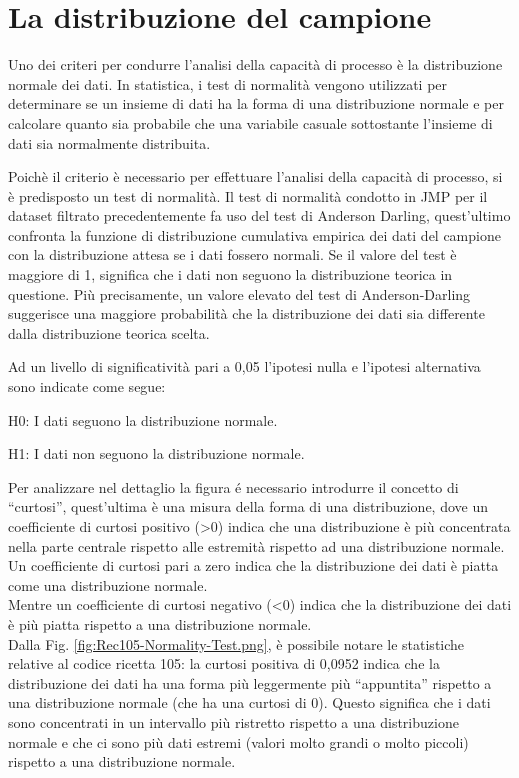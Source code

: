 
\label{La distribuzione del campione}
\section{La distribuzione del campione}

Uno dei criteri per condurre l'analisi della capacità di processo è la distribuzione normale dei dati.
In statistica, i test di normalità vengono utilizzati per determinare se un insieme di dati ha la forma di una distribuzione normale e per calcolare quanto sia probabile che una variabile casuale sottostante l'insieme di dati sia normalmente distribuita.
\cite{KULKARNI2022329}


Poichè il criterio è necessario per effettuare l'analisi della capacità di processo, si è predisposto un test di normalità.
Il test di normalità condotto in JMP per il dataset filtrato precedentemente fa uso del test di Anderson Darling, quest'ultimo confronta la funzione di distribuzione cumulativa empirica dei dati del campione con la distribuzione attesa se i dati fossero normali.
Se il valore del test è maggiore di 1, significa che i dati non seguono la distribuzione teorica in questione. Più precisamente, un valore elevato del test di Anderson-Darling suggerisce una maggiore probabilità che la distribuzione dei dati sia differente dalla distribuzione teorica scelta.
\cite{WikipediaAndersonArling}

Ad un livello di significatività pari a 0,05 l'ipotesi nulla e l'ipotesi alternativa sono indicate come segue:


H0: I dati seguono la distribuzione normale.


H1: I dati non seguono la distribuzione normale.


Per analizzare nel dettaglio la figura é necessario introdurre il concetto di ``curtosi'', quest'ultima è una misura della forma di una distribuzione, dove un coefficiente di curtosi positivo (>0) indica che una distribuzione è più concentrata nella parte centrale rispetto alle estremità rispetto ad una distribuzione normale. \\
Un coefficiente di curtosi pari a zero indica che la distribuzione dei dati è piatta come una distribuzione normale. \\
Mentre un coefficiente di curtosi negativo (<0) indica che la distribuzione dei dati è più piatta rispetto a una distribuzione normale. \cite{WikipediaKurtosis} \\
Dalla Fig. \ref{fig:Rec105-Normality-Test.png}, è possibile notare le statistiche relative al codice ricetta 105: la curtosi positiva di 0,0952 indica che la distribuzione dei dati ha una forma più leggermente più ``appuntita'' rispetto a una distribuzione normale (che ha una curtosi di 0). Questo significa che i dati sono concentrati in un intervallo più ristretto rispetto a una distribuzione normale e che ci sono più dati estremi (valori molto grandi o molto piccoli) rispetto a una distribuzione normale.



